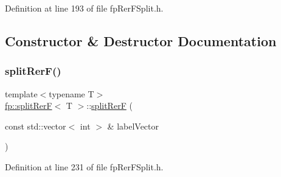Definition at line 193 of file fp\+Rer\+F\+Split.\+h.



\subsection{Constructor \& Destructor Documentation}
\mbox{\label{classfp_1_1splitRerF_ab1ce3680d3e353a59d3efafd1a3064c2}} 
\subsubsection{\texorpdfstring{split\+Rer\+F()}{splitRerF()}}
{\footnotesize\ttfamily template$<$typename T$>$ \\
\hyperlink{classfp_1_1splitRerF}{fp\+::split\+RerF}$<$ T $>$\+::\hyperlink{classfp_1_1splitRerF}{split\+RerF} (\begin{DoxyParamCaption}\item[{const std\+::vector$<$ int $>$ \&}]{label\+Vector }\end{DoxyParamCaption})\hspace{0.3cm}{\ttfamily [inline]}}



Definition at line 231 of file fp\+Rer\+F\+Split.\+h.


